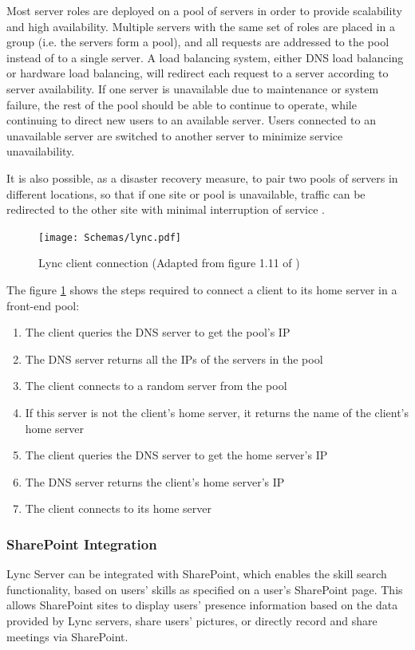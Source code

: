 Most server roles are deployed on a pool of servers in order to provide scalability and high availability. Multiple servers with the same set of roles are placed in a group (i.e. the servers form a pool), and all requests are addressed to the pool instead of to a single server. A load balancing system, either DNS load balancing or hardware load balancing, will redirect each request to a server according to server availability. If one server is unavailable due to maintenance or system failure, the rest of the pool should be able to continue to operate, while continuing to direct new users to an available server. Users connected to an unavailable server are switched to another server to minimize service unavailability.

It is also possible, as a disaster recovery measure, to pair two pools of servers in different locations, so that if one site or pool is unavailable, traffic can be redirected to the other site with minimal interruption of service
\cite{winters_mastering_2012}.

\begin{figure}[H]
	\centering
	\texttt{[image: Schemas/lync.pdf]}
	\caption[Lync client connection]{Lync client connection (Adapted from figure 1.11 of \cite{winters_mastering_2012})}
	\label{fig:lync_poolfe}
\end{figure}

The figure \ref{fig:lync_poolfe} shows the steps required to connect a client to its home server in a front-end pool:
\begin{enumerate}
\item The client queries the DNS server to get the pool's IP
\item The DNS server returns all the IPs of the servers in the pool
\item The client connects to a random server from the pool
\item If this server is not the client's home server, it returns the name of the client's home server
\item The client queries the DNS server to get the home server's IP
\item The DNS server returns the client's home server's IP
\item The client connects to its home server
\end{enumerate}

\subsubsection{SharePoint Integration}
Lync Server can be integrated with SharePoint, which enables the skill search functionality, based on users' skills as specified on a user's SharePoint page. This allows SharePoint sites to display users' presence information based on the data provided by Lync servers, share users' pictures, or directly record and share meetings via SharePoint.

